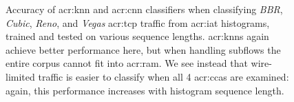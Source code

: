 \begin{figure}
    \centering
    \caption[Accuracy of $k$NN and CNN classifiers when classifying \emph{BBR}, \emph{Cubic}, \emph{Reno}, and \emph{Vegas} TCP traffic from IAT histograms, trained and tested on various sequence lengths.]{
    	Accuracy of \gls{acr:knn} and \gls{acr:cnn} classifiers when classifying \emph{BBR}, \emph{Cubic}, \emph{Reno}, and \emph{Vegas} \gls{acr:tcp} traffic from \gls{acr:iat} histograms, trained and tested on various sequence lengths.
    	\glspl{acr:knn} again achieve better performance here, but when handling subflows the entire corpus cannot fit into \gls{acr:ram}.
    	We see instead that wire-limited traffic is easier to classify when all 4 \glspl{acr:cca} are examined: again, this performance increases with histogram sequence length.
    	\label{fig:4c-results}
    }
\end{figure}

